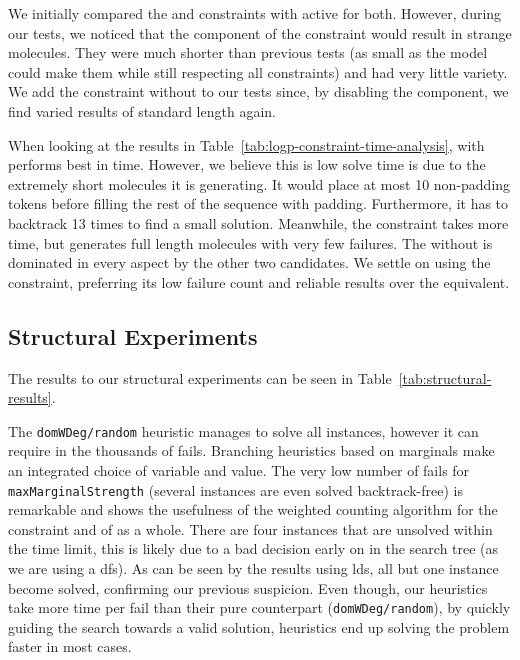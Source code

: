 \documentclass[../Document.tex]{subfiles}
\begin{document}
We initially compared the \shortTable and \regular constraints with \bp active for both. However, during our tests, we noticed that the \bp component of the \shortTable constraint would result in strange molecules. They were much shorter than previous tests (as small as the model could make them while still respecting all constraints) and had very little variety. We add the \shortTable constraint without \bp to our tests since, by disabling the \bp component, we find varied results of standard length again.

When looking at the results in Table~\ref{tab:logp-constraint-time-analysis}, \shortTable with \bp performs best in time.
However, we believe this is low solve time is due to the extremely short molecules it is generating. It would place at most 10 non-padding tokens before filling the rest of the sequence with padding.
Furthermore, it has to backtrack 13 times to find a small solution.
Meanwhile, the \regular constraint takes more time, but generates full length molecules with very few failures.
The \shortTable without \bp is dominated in every aspect by the other two candidates.
We settle on using the \regular constraint, preferring its low failure count and reliable results over the \shortTable equivalent.


\subsection{Structural Experiments}
The results to our structural experiments can be seen in Table~\ref{tab:structural-results}.

The \texttt{domWDeg/random} heuristic manages to solve all instances, however it can require in the thousands of fails.
Branching heuristics based on marginals make an integrated choice of variable and value.
The very low number of fails for \texttt{maxMarginalStrength} (several instances are even solved backtrack-free) is remarkable and shows the usefulness of the weighted counting algorithm for the \grammar constraint and of \bp as a whole.
There are four instances that are unsolved within the time limit, this is likely due to a bad decision early on in the search tree (as we are using a \gls{dfs}).
As can be seen by the results using \gls{lds}, all but one instance become solved, confirming our previous suspicion.
Even though, our \bp heuristics take more time per fail than their pure \cp counterpart (\ie \texttt{domWDeg/random}), by quickly guiding the search towards a valid solution, \bp heuristics end up solving the problem faster in most cases.
\end{document}
